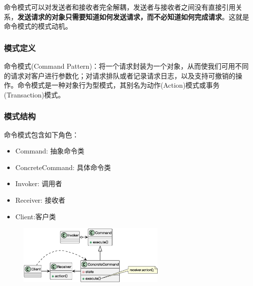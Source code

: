 命令模式可以对发送者和接收者完全解耦，发送者与接收者之间没有直接引用关系，\textbf{发送请求的对象只需要知道如何发送请求，而不必知道如何完成请求}。这就是命令模式的模式动机。

\subsubsection{模式定义}
命令模式(Command Pattern)：将一个请求封装为一个对象，从而使我们可用不同的请求对客户进行参数化；对请求排队或者记录请求日志，以及支持可撤销的操作。命令模式是一种对象行为型模式，其别名为动作(Action)模式或事务(Transaction)模式。

\subsubsection{模式结构}
命令模式包含如下角色：
\vspace{-0.8em}
\begin{multicols}{2}
    \begin{itemize}
        \item Command: 抽象命令类
        \item ConcreteCommand: 具体命令类
        \item Invoker: 调用者
        \item Receiver: 接收者
        \item Client:客户类
    \end{itemize}
\end{multicols}
\vspace{-1em}
\begin{figure}[H]
    \vspace{-0.5em}
	\centering
	\includegraphics[width=0.65\textwidth]{images/命令模式结构.eps}
    \vspace{-1em}
\end{figure}

